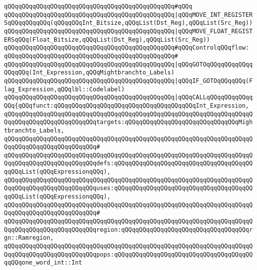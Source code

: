 \verb|qQQqqQQqqQQqqQQqqQQqqQQqqQQqqQQqqQQqqQQqqQQqqQQq#qQQq|\newline
\verb|qQQqqQQqqQQqqQQqqQQqqQQqqQQqqQQqqQQqqQQqqQQqqQQq|\verb#|qQQqMOVE_INT_REGISTERSqQQqqQQqqQQq(qQQqqQQqInt_Bitsize,qQQqList(Dst_Reg),qQQqList(Src_Reg))#\newline
\verb|qQQqqQQqqQQqqQQqqQQqqQQqqQQqqQQqqQQqqQQqqQQqqQQq|\verb#|qQQqMOVE_FLOAT_REGISTERSqQQq(Float_Bitsize,qQQqList(Dst_Reg),qQQqList(Src_Reg))#\newline
\newline
\verb|qQQqqQQqqQQqqQQqqQQqqQQqqQQqqQQqqQQqqQQqqQQqqQQq#qQQqControlqQQqflow:|\newline
\verb|qQQqqQQqqQQqqQQqqQQqqQQqqQQqqQQqqQQqqQQqqQQqqQQq#|\newline
\verb|qQQqqQQqqQQqqQQqqQQqqQQqqQQqqQQqqQQqqQQqqQQqqQQq|\verb#|qQQqGOTOqQQqqQQqqQQqqQQqqQQq(Int_Expression,qQQqMightbranchto_Labels)#\newline
\verb|qQQqqQQqqQQqqQQqqQQqqQQqqQQqqQQqqQQqqQQqqQQqqQQq|\verb#|qQQqIF_GOTOqQQqqQQq(Flag_Expression,qQQqlbl::Codelabel)#\newline
\newline
\verb|qQQqqQQqqQQqqQQqqQQqqQQqqQQqqQQqqQQqqQQqqQQqqQQq|\verb#|qQQqCALLqQQqqQQqqQQqqQQq{qQQqfunct:qQQqqQQqqQQqqQQqqQQqqQQqqQQqqQQqqQQqqQQqInt_Expression,#\newline
\verb|qQQqqQQqqQQqqQQqqQQqqQQqqQQqqQQqqQQqqQQqqQQqqQQqqQQqqQQqqQQqqQQqqQQqqQQqqQQqqQQqqQQqqQQqqQQqqQQqtargets:qQQqqQQqqQQqqQQqqQQqqQQqqQQqqQQqMightbranchto_Labels,|\newline
\verb|qQQqqQQqqQQqqQQqqQQqqQQqqQQqqQQqqQQqqQQqqQQqqQQqqQQqqQQqqQQqqQQqqQQqqQQqqQQqqQQqqQQqqQQqqQQqqQQq#|\newline
\verb|qQQqqQQqqQQqqQQqqQQqqQQqqQQqqQQqqQQqqQQqqQQqqQQqqQQqqQQqqQQqqQQqqQQqqQQqqQQqqQQqqQQqqQQqqQQqqQQqdefs:qQQqqQQqqQQqqQQqqQQqqQQqqQQqqQQqqQQqqQQqqQQqList(qQQqExpressionqQQq),|\newline
\verb|qQQqqQQqqQQqqQQqqQQqqQQqqQQqqQQqqQQqqQQqqQQqqQQqqQQqqQQqqQQqqQQqqQQqqQQqqQQqqQQqqQQqqQQqqQQqqQQquses:qQQqqQQqqQQqqQQqqQQqqQQqqQQqqQQqqQQqqQQqqQQqList(qQQqExpressionqQQq),|\newline
\verb|qQQqqQQqqQQqqQQqqQQqqQQqqQQqqQQqqQQqqQQqqQQqqQQqqQQqqQQqqQQqqQQqqQQqqQQqqQQqqQQqqQQqqQQqqQQqqQQq#|\newline
\verb|qQQqqQQqqQQqqQQqqQQqqQQqqQQqqQQqqQQqqQQqqQQqqQQqqQQqqQQqqQQqqQQqqQQqqQQqqQQqqQQqqQQqqQQqqQQqqQQqregion:qQQqqQQqqQQqqQQqqQQqqQQqqQQqqQQqqQQqrgn::Ramregion,|\newline
\verb|qQQqqQQqqQQqqQQqqQQqqQQqqQQqqQQqqQQqqQQqqQQqqQQqqQQqqQQqqQQqqQQqqQQqqQQqqQQqqQQqqQQqqQQqqQQqqQQqpops:qQQqqQQqqQQqqQQqqQQqqQQqqQQqqQQqqQQqqQQqqQQqone_word_int::Int|\newline
